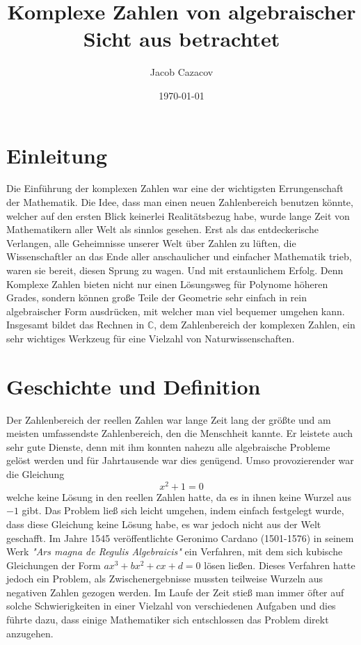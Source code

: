 \documentclass[a4paper,12pt]{article} %
\author{Jacob Cazacov}
\title{Komplexe Zahlen von algebraischer Sicht aus betrachtet}
\date{\today}
\begin{document}

\maketitle

\newpage

\tableofcontents

\newpage

\section{Einleitung}

Die Einführung der komplexen Zahlen war eine der wichtigsten Errungenschaft der Mathematik.
Die Idee, dass man einen neuen Zahlenbereich benutzen könnte, welcher auf den ersten Blick keinerlei Realitätsbezug habe, wurde lange Zeit von Mathematikern aller Welt als sinnlos gesehen.
Erst als das entdeckerische Verlangen, alle Geheimnisse unserer Welt über Zahlen zu lüften, die Wissenschaftler an das Ende aller anschaulicher und einfacher Mathematik trieb, waren sie bereit, diesen Sprung zu wagen.
Und mit erstaunlichem Erfolg.
Denn Komplexe Zahlen bieten nicht nur einen Lösungsweg für Polynome höheren Grades, sondern können große Teile der Geometrie sehr einfach in rein algebraischer Form ausdrücken, mit welcher man viel bequemer umgehen kann.
Insgesamt bildet das Rechnen in $\mathbb{C}$, dem Zahlenbereich der komplexen Zahlen, ein sehr wichtiges Werkzeug für eine Vielzahl von Naturwissenschaften.

\section{Geschichte und Definition}

Der Zahlenbereich der reellen Zahlen war lange Zeit lang der größte und am meisten umfassendste Zahlenbereich, den die Menschheit kannte.
Er leistete auch sehr gute Dienste, denn mit ihm konnten nahezu alle algebraische Probleme gelöst werden und für Jahrtausende war dies genügend.
Umso provozierender war die Gleichung 
\[x^2+1=0\]
welche keine Lösung in den reellen Zahlen hatte, da es in ihnen keine Wurzel aus $-1$ gibt.
Das Problem ließ sich leicht umgehen, indem einfach festgelegt wurde, dass diese Gleichung keine Lösung habe, es war jedoch nicht aus der Welt geschafft.
Im Jahre 1545 veröffentlichte Geronimo Cardano (1501-1576) in seinem Werk \emph{"{Ars} magna de Regulis Algebraicis"} ein Verfahren, mit dem sich kubische Gleichungen der Form $ax^3+bx^2+cx+d=0$ lösen ließen.
Dieses Verfahren hatte jedoch ein Problem, als Zwischenergebnisse mussten teilweise Wurzeln aus negativen Zahlen gezogen werden.  
Im Laufe der Zeit stieß man immer öfter auf solche Schwierigkeiten in einer Vielzahl von verschiedenen Aufgaben und dies führte dazu, dass einige Mathematiker sich entschlossen das Problem direkt anzugehen.
\end{document}
